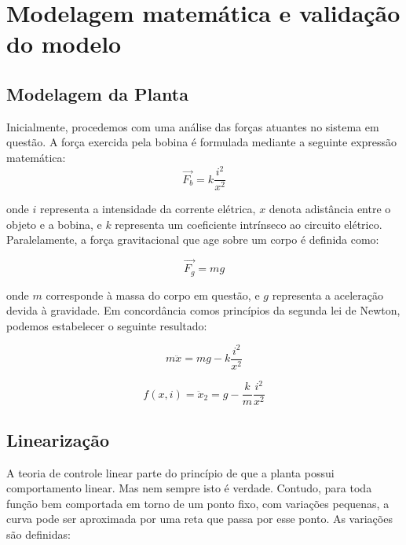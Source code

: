 \documentclass{ifacconf}
\begin{document}
\section{Modelagem matemática e validação do modelo}



\subsection{Modelagem da Planta}

Inicialmente, procedemos com uma análise das forças atuantes
no sistema em questão. A força exercida pela bobina é formulada
mediante a seguinte expressão matemática:
\begin{equation}
    \vec{F_b} = k \frac{i^2}{x^2}
\end{equation}

\noindent onde $i$ representa a intensidade da corrente elétrica, $x$ denota adistância entre o objeto e a bobina, e $k$ representa um coeficiente intrínseco ao circuito elétrico. Paralelamente, a força gravitacional que age sobre um corpo é definida como:

\begin{equation}
    \vec{F_g} = mg
\end{equation}

\noindent onde $m$ corresponde à massa do corpo em questão, e $g$ representa a aceleração devida à gravidade. Em concordância comos princípios da segunda lei de Newton, podemos estabelecer o
seguinte resultado:

\begin{equation}
    m\ddot{x} = mg - k \frac{i^2}{x^2}
\end{equation}

\begin{equation}
    f(x,i) = \ddot{x}_2 = g - \frac{k}{m} \frac{i^2}{x^2}
    \label{eq:eqdif}
\end{equation}

\subsection{Linearização}

A teoria de controle linear parte do princípio de que a planta
possui comportamento linear. Mas nem sempre isto é
verdade. Contudo, para toda função bem comportada em torno de
um ponto fixo, com variações pequenas, a curva pode ser aproximada por uma reta que passa por esse ponto. As variações são definidas:
\end{document}
